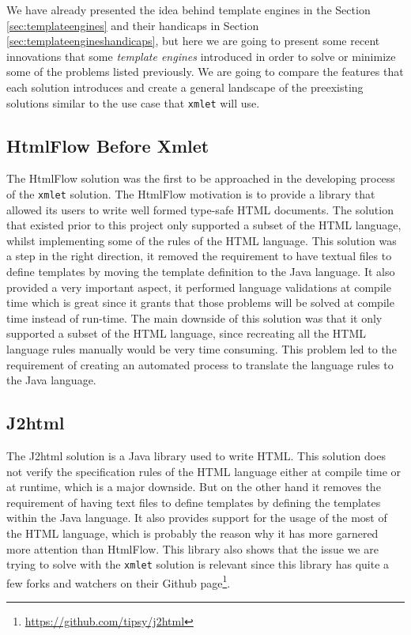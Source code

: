 We have already presented the idea behind template engines in the Section \ref{sec:templateengines} and their handicaps in Section  \ref{sec:templateengineshandicaps}, but here we are going to present some recent innovations that some \textit{template engines} introduced in order to solve or minimize some of the problems listed previously. We are going to compare the features that each solution introduces and create a general landscape of the preexisting solutions similar to the use case that \texttt{xmlet} will use.

\subsection{HtmlFlow Before Xmlet}
\label{sec:htmlflowbeforexmlet}

The HtmlFlow\cite{htmlflow} solution was the first to be approached in the developing process of the \texttt{xmlet} solution. The HtmlFlow motivation is to provide a library that allowed its users to write well formed type-safe \ac{HTML} documents. The solution that existed prior to this project only supported a subset of the \ac{HTML} language, whilst implementing some of the rules of the \ac{HTML} language. This solution was a step in the right direction, it removed the requirement to have textual files to define templates by moving the template definition to the Java language. It also provided a very important aspect, it performed language validations at compile time which is great since it grants that those problems will be solved at compile time instead of run-time. The main downside of this solution was that it only supported a subset of the \ac{HTML} language, since recreating all the \ac{HTML} language rules manually would be very time consuming. This problem led to the requirement of creating an automated process to translate the language rules to the Java language.

\subsection{J2html} %
\label{sec:j2html}

The J2html\cite{j2html} solution is a Java library used to write \ac{HTML}. This solution does not verify the specification rules of the \ac{HTML} language either at compile time or at runtime, which is a major downside. But on the other hand it removes the requirement of having text files to define templates by defining the templates within the Java language. It also provides support for the usage of the most of the \ac{HTML} language, which is probably the reason why it has more garnered more attention than HtmlFlow. This library also shows that the issue we are trying to solve with the \texttt{xmlet} solution is relevant since this library has quite a few forks and watchers on their Github page\footnote{\url{https://github.com/tipsy/j2html}}. 

